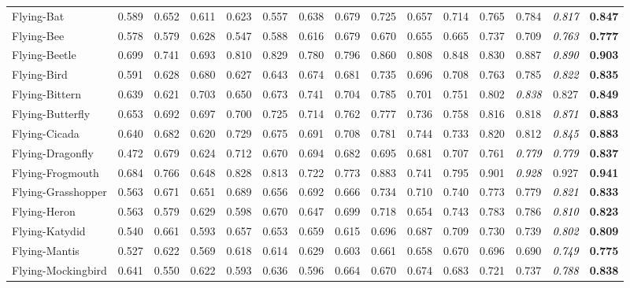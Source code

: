 \documentclass[10pt,journal,compsoc]{IEEEtran}
\newcommand{\Rev}[1]{\textcolor{black}{#1}}
\begin{document}
\begin{table*}[thp!]
\begin{tabular}{l | ccccc ccccc cccc}
Flying-Bat &0.589 &0.652 &0.611 &0.623 &0.557 &0.638 &0.679 &0.725 &0.657 &0.714 &0.765 &0.784 & \Rev{\textit{0.817}} &\textbf{0.847}\\
\rowcolor{mygray}
Flying-Bee &0.578 &0.579 &0.628 &0.547 &0.588 &0.616 &0.679 &0.670 &0.655 &0.665 &0.737 &0.709 & \Rev{\textit{0.763}} &\textbf{0.777}\\
Flying-Beetle &0.699 &0.741 &0.693 &0.810 &0.829 &0.780 &0.796 &0.860 &0.808 &0.848 &0.830 &0.887 & \Rev{\textit{0.890}} &\textbf{0.903}\\
\rowcolor{mygray}
Flying-Bird &0.591 &0.628 &0.680 &0.627 &0.643 &0.674 &0.681 &0.735 &0.696 &0.708 &0.763 &0.785 & \Rev{\textit{0.822}} &\textbf{0.835}\\
Flying-Bittern &0.639 &0.621 &0.703 &0.650 &0.673 &0.741 &0.704 &0.785 &0.701 &0.751 &0.802 & \Rev{\textit{0.838}} &0.827 &\textbf{0.849}\\
\rowcolor{mygray}
Flying-Butterfly &0.653 &0.692 &0.697 &0.700 &0.725 &0.714 &0.762 &0.777 &0.736 &0.758 &0.816 &0.818 & \Rev{\textit{0.871}} &\textbf{0.883}\\
Flying-Cicada &0.640 &0.682 &0.620 &0.729 &0.675 &0.691 &0.708 &0.781 &0.744 &0.733 &0.820 &0.812 & \Rev{\textit{0.845}} &\textbf{0.883}\\
\rowcolor{mygray}
Flying-Dragonfly &0.472 &0.679 &0.624 &0.712 &0.670 &0.694 &0.682 &0.695 &0.681 &0.707 &0.761 & \Rev{\textit{0.779}} & \Rev{\textit{0.779}} &\textbf{0.837}\\
Flying-Frogmouth &0.684 &0.766 &0.648 &0.828 &0.813 &0.722 &0.773 &0.883 &0.741 &0.795 &0.901 & \Rev{\textit{0.928}} &0.927 &\textbf{0.941}\\
\rowcolor{mygray}
Flying-Grasshopper &0.563 &0.671 &0.651 &0.689 &0.656 &0.692 &0.666 &0.734 &0.710 &0.740 &0.773 &0.779 & \Rev{\textit{0.821}} &\textbf{0.833}\\
Flying-Heron &0.563 &0.579 &0.629 &0.598 &0.670 &0.647 &0.699 &0.718 &0.654 &0.743 &0.783 &0.786 & \Rev{\textit{0.810}} &\textbf{0.823}\\
\rowcolor{mygray}
Flying-Katydid &0.540 &0.661 &0.593 &0.657 &0.653 &0.659 &0.615 &0.696 &0.687 &0.709 &0.730 &0.739 & \Rev{\textit{0.802}} &\textbf{0.809}\\
Flying-Mantis &0.527 &0.622 &0.569 &0.618 &0.614 &0.629 &0.603 &0.661 &0.658 &0.670 &0.696 &0.690 & \Rev{\textit{0.749}} &\textbf{0.775}\\
\rowcolor{mygray}
Flying-Mockingbird &0.641 &0.550 &0.622 &0.593 &0.636 &0.596 &0.664 &0.670 &0.674 &0.683 &0.721 &0.737 & \Rev{\textit{0.788}} &\textbf{0.838}\\

\end{tabular}
\end{table*}
\end{document}
